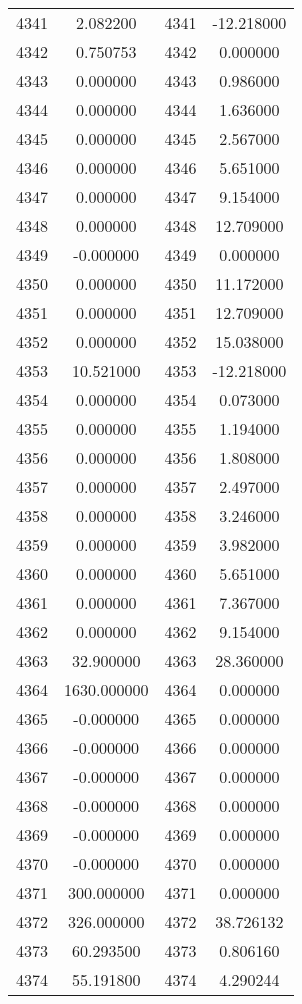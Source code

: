 \documentclass[12pt]{article}
\begin{document}
\begin{longtable}{@{}cccc@{}}
4341 & 2.082200 & 4341 & -12.218000 \\
4342 & 0.750753 & 4342 & 0.000000 \\
4343 & 0.000000 & 4343 & 0.986000 \\
4344 & 0.000000 & 4344 & 1.636000 \\
4345 & 0.000000 & 4345 & 2.567000 \\
4346 & 0.000000 & 4346 & 5.651000 \\
4347 & 0.000000 & 4347 & 9.154000 \\
4348 & 0.000000 & 4348 & 12.709000 \\
4349 & -0.000000 & 4349 & 0.000000 \\
4350 & 0.000000 & 4350 & 11.172000 \\
4351 & 0.000000 & 4351 & 12.709000 \\
4352 & 0.000000 & 4352 & 15.038000 \\
4353 & 10.521000 & 4353 & -12.218000 \\
4354 & 0.000000 & 4354 & 0.073000 \\
4355 & 0.000000 & 4355 & 1.194000 \\
4356 & 0.000000 & 4356 & 1.808000 \\
4357 & 0.000000 & 4357 & 2.497000 \\
4358 & 0.000000 & 4358 & 3.246000 \\
4359 & 0.000000 & 4359 & 3.982000 \\
4360 & 0.000000 & 4360 & 5.651000 \\
4361 & 0.000000 & 4361 & 7.367000 \\
4362 & 0.000000 & 4362 & 9.154000 \\
4363 & 32.900000 & 4363 & 28.360000 \\
4364 & 1630.000000 & 4364 & 0.000000 \\
4365 & -0.000000 & 4365 & 0.000000 \\
4366 & -0.000000 & 4366 & 0.000000 \\
4367 & -0.000000 & 4367 & 0.000000 \\
4368 & -0.000000 & 4368 & 0.000000 \\
4369 & -0.000000 & 4369 & 0.000000 \\
4370 & -0.000000 & 4370 & 0.000000 \\
4371 & 300.000000 & 4371 & 0.000000 \\
4372 & 326.000000 & 4372 & 38.726132 \\
4373 & 60.293500 & 4373 & 0.806160 \\
4374 & 55.191800 & 4374 & 4.290244 \\

\end{longtable}
\end{document}

